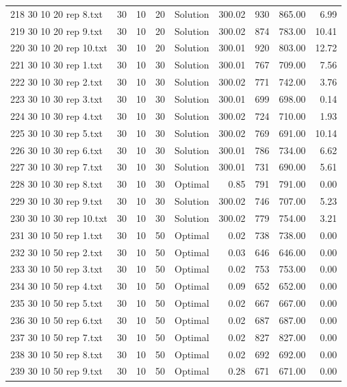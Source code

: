 \begin{longtable}{lrrllrrrr}
218 30 10 20 rep 8.txt & 30 & 10 & 20 & Solution & 300.02 & 930 & 865.00 &  6.99\\
219 30 10 20 rep 9.txt & 30 & 10 & 20 & Solution & 300.02 & 874 & 783.00 & 10.41\\
220 30 10 20 rep 10.txt & 30 & 10 & 20 & Solution & 300.01 & 920 & 803.00 & 12.72\\
221 30 10 30 rep 1.txt & 30 & 10 & 30 & Solution & 300.01 & 767 & 709.00 &  7.56\\
222 30 10 30 rep 2.txt & 30 & 10 & 30 & Solution & 300.02 & 771 & 742.00 &  3.76\\
223 30 10 30 rep 3.txt & 30 & 10 & 30 & Solution & 300.01 & 699 & 698.00 &  0.14\\
224 30 10 30 rep 4.txt & 30 & 10 & 30 & Solution & 300.02 & 724 & 710.00 &  1.93\\
225 30 10 30 rep 5.txt & 30 & 10 & 30 & Solution & 300.02 & 769 & 691.00 & 10.14\\
226 30 10 30 rep 6.txt & 30 & 10 & 30 & Solution & 300.01 & 786 & 734.00 &  6.62\\
227 30 10 30 rep 7.txt & 30 & 10 & 30 & Solution & 300.01 & 731 & 690.00 &  5.61\\
228 30 10 30 rep 8.txt & 30 & 10 & 30 & Optimal &  0.85 & 791 & 791.00 &  0.00\\
229 30 10 30 rep 9.txt & 30 & 10 & 30 & Solution & 300.02 & 746 & 707.00 &  5.23\\
230 30 10 30 rep 10.txt & 30 & 10 & 30 & Solution & 300.02 & 779 & 754.00 &  3.21\\
231 30 10 50 rep 1.txt & 30 & 10 & 50 & Optimal &  0.02 & 738 & 738.00 &  0.00\\
232 30 10 50 rep 2.txt & 30 & 10 & 50 & Optimal &  0.03 & 646 & 646.00 &  0.00\\
233 30 10 50 rep 3.txt & 30 & 10 & 50 & Optimal &  0.02 & 753 & 753.00 &  0.00\\
234 30 10 50 rep 4.txt & 30 & 10 & 50 & Optimal &  0.09 & 652 & 652.00 &  0.00\\
235 30 10 50 rep 5.txt & 30 & 10 & 50 & Optimal &  0.02 & 667 & 667.00 &  0.00\\
236 30 10 50 rep 6.txt & 30 & 10 & 50 & Optimal &  0.02 & 687 & 687.00 &  0.00\\
237 30 10 50 rep 7.txt & 30 & 10 & 50 & Optimal &  0.02 & 827 & 827.00 &  0.00\\
238 30 10 50 rep 8.txt & 30 & 10 & 50 & Optimal &  0.02 & 692 & 692.00 &  0.00\\
239 30 10 50 rep 9.txt & 30 & 10 & 50 & Optimal &  0.28 & 671 & 671.00 &  0.00\\

\end{longtable}
